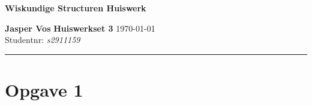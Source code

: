 \documentclass{article}
\begin{document}
{\Large \textbf{Wiskundige Structuren Huiswerk}}

\bigskip

\textbf{Jasper Vos} \hfill \textbf{Huiswerkset 3} \hfill \today \\
Studentnr: \emph{s2911159}

\rule{\textwidth}{2pt}

\bigskip

\newcommand{\N}{\mathbb{N}}
\newcommand{\f}[2]{\frac{#1}{#2}}
\newcommand{\tx}[1]{\text{#1}}
\newcommand{\cn}[1]{\cancel{#1}}
\newcommand{\R}{\mathbb{R}}
\newcommand{\Rho}{\mathcal{P}}
\newcommand{\en}{\tx{ en }}
\newcommand{\of}{\tx{ of }}
\newcommand{\geldt}{\tx{ geldt }}
\newcommand{\dan}{\tx{ dan }}
\newcommand{\als}{\tx{ als }}

\section*{Opgave 1}
\end{document}
